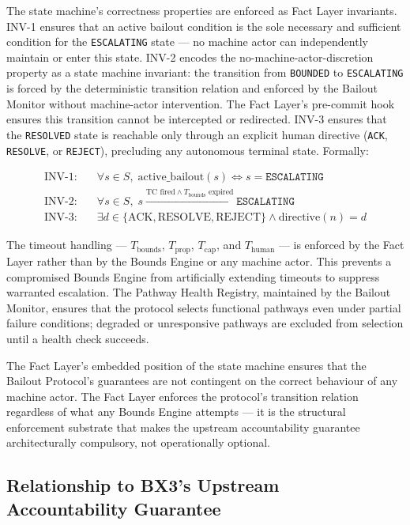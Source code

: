 The state machine's correctness properties are enforced as Fact Layer invariants. INV-1 ensures that an active bailout condition is the sole necessary and sufficient condition for the \texttt{ESCALATING} state — no machine actor can independently maintain or enter this state. INV-2 encodes the no-machine-actor-discretion property as a state machine invariant: the transition from \texttt{BOUNDED} to \texttt{ESCALATING} is forced by the deterministic transition relation and enforced by the Bailout Monitor without machine-actor intervention. The Fact Layer's pre-commit hook ensures this transition cannot be intercepted or redirected. INV-3 ensures that the \texttt{RESOLVED} state is reachable only through an explicit human directive (\texttt{ACK}, \texttt{RESOLVE}, or \texttt{REJECT}), precluding any autonomous terminal state. Formally:

\begin{align}
\text{INV-1:} \quad & \forall s \in S,\; \text{active\_bailout}(s) \iff s = \texttt{ESCALATING} \\
\text{INV-2:} \quad & \forall s \in S,\; s \xrightarrow{\text{TC fired} \land T_{\text{bounds}} \text{ expired}} \texttt{ESCALATING} \\
\text{INV-3:} \quad & \exists d \in \{\text{ACK}, \text{RESOLVE}, \text{REJECT}\} \land \text{directive}(n) = d
\end{align}

The timeout handling — $T_{\text{bounds}}$, $T_{\text{prop}}$, $T_{\text{cap}}$, and $T_{\text{human}}$ — is enforced by the Fact Layer rather than by the Bounds Engine or any machine actor. This prevents a compromised Bounds Engine from artificially extending timeouts to suppress warranted escalation. The Pathway Health Registry, maintained by the Bailout Monitor, ensures that the protocol selects functional pathways even under partial failure conditions; degraded or unresponsive pathways are excluded from selection until a health check succeeds.

The Fact Layer's embedded position of the state machine ensures that the Bailout Protocol's guarantees are not contingent on the correct behaviour of any machine actor. The Fact Layer enforces the protocol's transition relation regardless of what any Bounds Engine attempts — it is the structural enforcement substrate that makes the upstream accountability guarantee architecturally compulsory, not operationally optional.

\subsection{Relationship to BX3's Upstream Accountability Guarantee}
\label{sec:upstream-guarantee}

